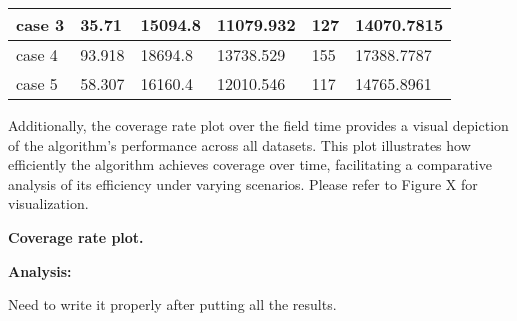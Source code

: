 \begin{table}[]
\begin{tabular}{llllll}
    \rowcolor[HTML]{FFFFC7} 
    case 3                  & 35.71                                                                                  & 15094.8                                                                                   & 11079.932                                                                           & 127                                                                        & 14070.7815                                                                                 \\ \hline
    \rowcolor[HTML]{FFFFC7} 
    case 4                  & 93.918                                                                                 & 18694.8                                                                                   & 13738.529                                                                           & 155                                                                        & 17388.7787                                                                                 \\ \hline
    \rowcolor[HTML]{FFFFC7} 
    case 5                  & 58.307                                                                                 & 16160.4                                                                                   & 12010.546                                                                           & 117                                                                        & 14765.8961                                                                                 \\ \hline
    \end{tabular}
    \end{table}

\vspace*{6mm}

Additionally, the coverage rate plot over the field time provides a visual depiction of the algorithm's performance across all datasets. This plot illustrates how efficiently the algorithm achieves coverage over time, facilitating a comparative analysis of its efficiency under varying scenarios. Please refer to Figure X for visualization.

\textbf{Coverage rate plot.}

\textbf{Analysis: }

Need to write it properly after putting all the results.  
